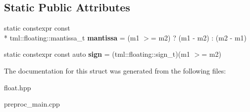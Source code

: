\subsection*{Static Public Attributes}
\begin{DoxyCompactItemize}
\item 
\hypertarget{structtml_1_1add_3_01tml_1_1floating_1_1number_3_01S__LHS_00_01E__LHS_00_01M__LHS_01_4_00_01tml_ae8c40fd43e7d15c5a5dcc83d2ae89a7_a02746551186cfe0b42033f3595870dc0}{static constexpr const \\*
tml\+::floating\+::mantissa\+\_\+t {\bfseries mantissa} = (m1 $>$= m2) ? (m1 -\/ m2) \+: (m2 -\/ m1)}\label{structtml_1_1add_3_01tml_1_1floating_1_1number_3_01S__LHS_00_01E__LHS_00_01M__LHS_01_4_00_01tml_ae8c40fd43e7d15c5a5dcc83d2ae89a7_a02746551186cfe0b42033f3595870dc0}

\item 
\hypertarget{structtml_1_1add_3_01tml_1_1floating_1_1number_3_01S__LHS_00_01E__LHS_00_01M__LHS_01_4_00_01tml_ae8c40fd43e7d15c5a5dcc83d2ae89a7_aef24aa91258f89b2f8010f4dc44a9245}{static constexpr const auto {\bfseries sign} = (tml\+::floating\+::sign\+\_\+t)(m1 $>$= m2)}\label{structtml_1_1add_3_01tml_1_1floating_1_1number_3_01S__LHS_00_01E__LHS_00_01M__LHS_01_4_00_01tml_ae8c40fd43e7d15c5a5dcc83d2ae89a7_aef24aa91258f89b2f8010f4dc44a9245}

\end{DoxyCompactItemize}


The documentation for this struct was generated from the following files\+:\begin{DoxyCompactItemize}
\item 
float.\+hpp\item 
preproc\+\_\+main.\+cpp\end{DoxyCompactItemize}
